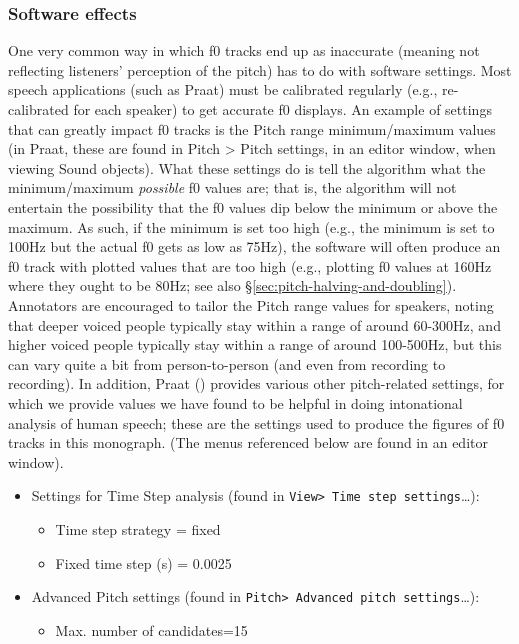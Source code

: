 \documentclass[11pt, twoside]{memoir}
\begin{document}
{{{\subsubsection{Software effects}\label{sec:software-effects}
One very common way in which f0 tracks end up as inaccurate (meaning not reflecting listeners’ perception of the pitch) has to do with software settings. Most speech applications (such as Praat) must be calibrated regularly (e.g., re-calibrated for each speaker) to get accurate f0 displays.
An example of settings that can greatly impact f0 tracks is the Pitch range minimum\slash maximum values (in Praat, these are found in Pitch > Pitch settings, in an editor window, when viewing Sound objects). What these settings do is tell the algorithm what the minimum\slash maximum \emph{possible} f0 values are; that is, the algorithm will not entertain the possibility that the f0 values dip below the minimum or above the maximum. As such, if the minimum is set too high (e.g., the minimum is set to 100Hz but the actual f0 gets as low as 75Hz), the software will often produce an f0 track with plotted values that are too high (e.g., plotting f0 values at 160Hz where they ought to be 80Hz; see also §\ref{sec:pitch-halving-and-doubling}). Annotators are encouraged to tailor the Pitch range values for speakers, noting that deeper voiced people typically stay within a range of around 60-300Hz, and higher voiced people typically stay within a range of around 100-500Hz, but this can vary quite a bit from person-to-person (and even from recording to recording).
In addition, Praat (\citealt{praat}) provides various other pitch-related settings, for which we provide values we have found to be helpful in doing intonational analysis of human speech; these are the settings used to produce the figures of f0 tracks in this monograph. (The menus referenced below are found in an editor window).
\begin{itemize}
\item Settings for Time Step analysis (found in \texttt{View> Time step settings}\ldots):
	\begin{itemize}
		\item Time step strategy = fixed
		\item Fixed time step (s) = 0.0025
	\end{itemize} 
\item Advanced Pitch settings (found in \texttt{Pitch> Advanced pitch settings}\ldots):
	\begin{itemize}
		\item Max. number of candidates=15

\end{itemize}
\end{itemize}}}}
\end{document}
